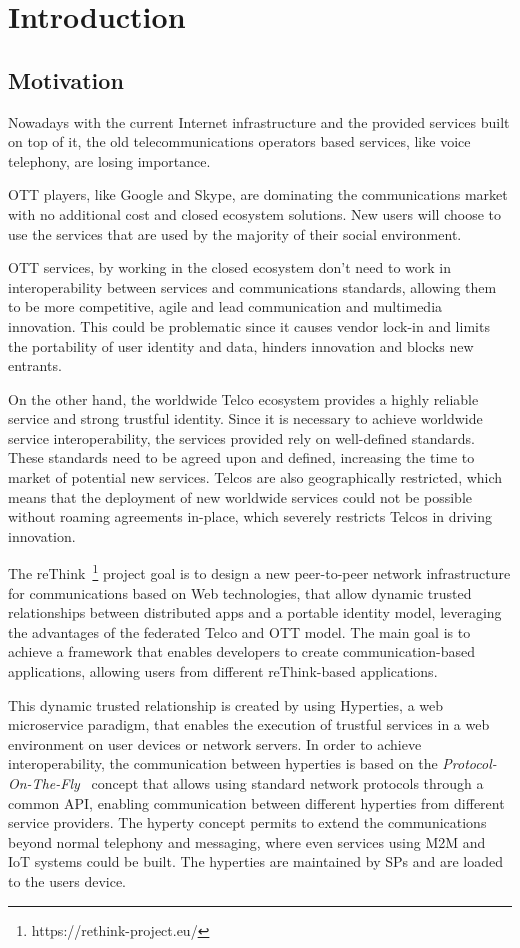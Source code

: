 \chapter{Introduction}
\label{chapter:introduction}

\section{Motivation}
\label{section:motivation}

Nowadays with the current Internet infrastructure and the provided services built on top of it, the old telecommunications operators based services, like voice telephony, are losing importance.

\ac{OTT} players, like Google and Skype, are dominating the communications market with no additional cost and closed ecosystem solutions.
New users will choose to use the services that are used by the majority of their social environment.

\ac{OTT} services, by working in the closed ecosystem don't need to work in interoperability between services and communications standards, allowing them to be more competitive, agile and lead communication and multimedia innovation.
This could be problematic since it causes vendor lock-in and limits the portability of user identity and data, hinders innovation and blocks new entrants.

On the other hand, the worldwide Telco ecosystem provides a highly reliable service and strong trustful identity.
Since it is necessary to achieve worldwide service interoperability, the services provided rely on well-defined standards. These standards need to be agreed upon and defined, increasing the time to market of potential new services.
Telcos are also geographically restricted, which means that the deployment of new worldwide services could not be possible without roaming agreements in-place, which severely restricts Telcos in driving innovation.

The reThink~\footnote{https://rethink-project.eu/} project goal is to design a new peer-to-peer network infrastructure for communications based on Web technologies, that allow dynamic trusted relationships between distributed apps and a portable identity model, leveraging the advantages of the federated Telco and \ac{OTT} model.
The main goal is to achieve a framework that enables developers to create communication-based applications, allowing users from different reThink-based applications.

This dynamic trusted relationship is created by using \ac{Hyperties}, a web microservice paradigm, that enables the execution of trustful services in a web environment on user devices or network servers.
In order to achieve interoperability, the communication between hyperties is based on the \textit{Protocol-On-The-Fly}~\cite{protofly} concept that allows using standard network protocols through a common API, enabling communication between different hyperties from different service providers.
The hyperty concept permits to extend the communications beyond normal telephony and messaging, where even services using \ac{M2M} and \ac{IoT} systems could be built.
The hyperties are maintained by \acp{SP} and are loaded to the users device.

